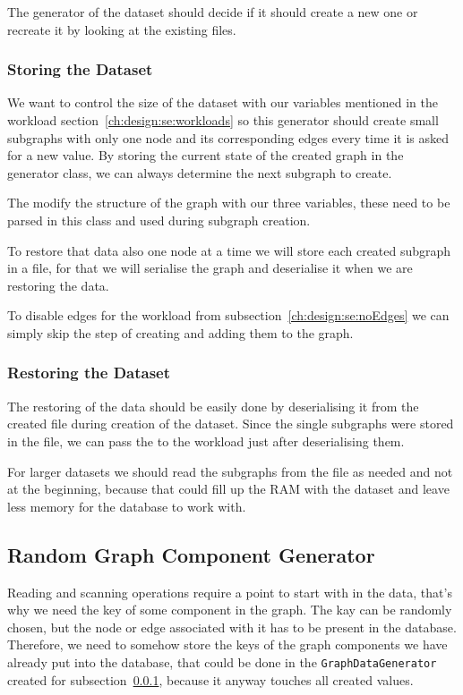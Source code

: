 The generator of the dataset should decide if it should create a new one or recreate it by looking at the existing files.

\subsubsection{Storing the Dataset}
\label{ch:design:se:storingTheDataset}
We want to control the size of the dataset with our variables mentioned in the workload section~\ref{ch:design:se:workloads} so this generator should create small subgraphs with only one node and its corresponding edges every time it is asked for a new value.
By storing the current state of the created graph in the generator class,
we can always determine the next subgraph to create.

The modify the structure of the graph with our three variables,
these need to be parsed in this class and used during subgraph creation.

To restore that data also one node at a time we will store each created subgraph in a file,
for that we will serialise the graph and deserialise it when we are restoring the data.

To disable edges for the workload from subsection~\ref{ch:design:se:noEdges} we can simply skip the step of creating and adding them to the graph.

\subsubsection{Restoring the Dataset}
\label{ch:design:se:restoringTheDataset}
The restoring of the data should be easily done by deserialising it from the created file during creation of the dataset.
Since the single subgraphs were stored in the file,
we can pass the to the workload just after deserialising them.

For larger datasets we should read the subgraphs from the file as needed and not at the beginning,
because that could fill up the RAM with the dataset and leave less memory for the database to work with.

\subsection{Random Graph Component Generator}
Reading and scanning operations require a point to start with in the data,
that's why we need the key of some component in the graph.
The kay can be randomly chosen,
but the node or edge associated with it has to be present in the database.
Therefore,
we need to somehow store the keys of the graph components we have already put into the database,
that could be done in the \texttt{GraphDataGenerator} created for subsection~\ref{ch:design:se:storingTheDataset},
because it anyway touches all created values.

